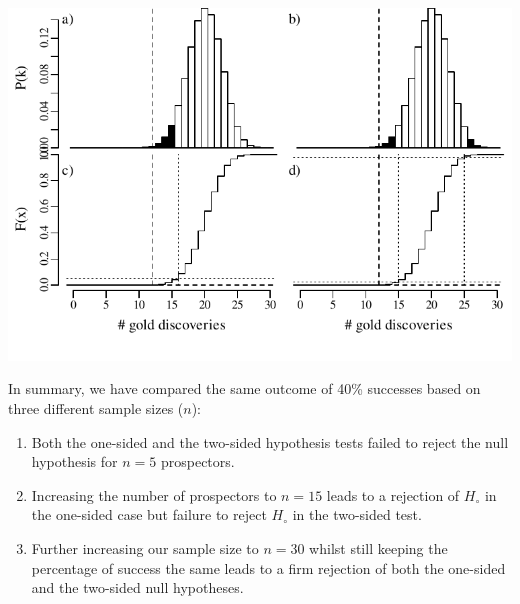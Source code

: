 \noindent\begin{minipage}[t][][b]{.65\textwidth}
  \includegraphics[width=\textwidth]{../figures/binomialrejection30.pdf}
\end{minipage}
\begin{minipage}[t][][t]{.35\textwidth}
  \label{fig:binomialrejection30}
\end{minipage}

In summary, we have compared the same outcome of 40\% successes based
on three different sample sizes ($n$):

\begin{enumerate}
  \item Both the one-sided and the two-sided hypothesis tests failed
    to reject the null hypothesis for $n=5$ prospectors.
  \item Increasing the number of prospectors to $n=15$ leads to a
    rejection of $H_\circ$ in the one-sided case but failure to reject
    $H_\circ$ in the two-sided test.
  \item Further increasing our sample size to $n=30$ whilst still
    keeping the percentage of success the same leads to a firm
    rejection of both the one-sided and the two-sided null hypotheses.
\end{enumerate}

